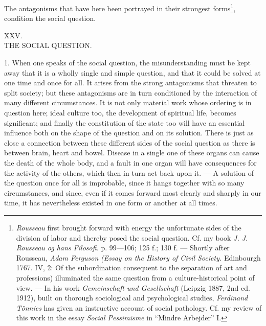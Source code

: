 \documentclass[12pt,a4paper,openany]{book}
\newcommand{\opage}[1]{\marginnote{\footnotesize\textit{[#1]}}}
\newcounter{etikch}
\newcommand{\chapterhead}[2]{\stepcounter{etikch}\bigskip\begin{center}\pdfbookmark[1]{#1 #2}{etikch.\arabic{etikch}}#1\\[3pt]{\large #2}\end{center}\medskip}
\begin{document}
The antagonisms that have here been portrayed in their strongest forms\footnote[1]{\emph{Rousseau} first brought forward with
energy the unfortunate sides of the division of labor and thereby posed the social question. Cf. my book \textit{J. J.
Rousseau og hans Filosofi.} p. 99---106; 125 f.; 130 f. --- Shortly after Rousseau, \emph{Adam Ferguson} \textit{(Essay on
the History of Civil Society.} Edinbourgh 1767. IV, 2: Of the subordination consequent to the separation of art and
professions) illuminated the same question from a culture-historical point of view. --- In his work \textit{Gemeinschaft
und Gesellschaft} (Leipzig 1887, 2nd ed. 1912), built on thorough sociological and psychological studies, \emph{Ferdinand
Tönnies} has given an instructive account of social pathology. Cf. my review of this work in the essay \textit{Social
Pessimisme} in ``Mindre Arbejder'' I.}, condition the social question.

\chapterhead{XXV.}{THE SOCIAL QUESTION.}

1. When one speaks of the social question, the misunderstanding must be kept away that it is a wholly single and simple
question, and that it could be solved at one time and once for all. It arises from the strong antagonisms that threaten
to split society; but these antagonisms are in turn conditioned by the interaction of many different circumstances. It is
not only material work whose ordering is in question here; ideal culture too, the development of spiritual life, becomes
significant; and finally the constitution of the state too will have an essential influence both on the shape of the
question and on its solution. There is just as close a connection between these different sides of the social question as
there is between brain, heart and bowel. Disease in a single one of these
\opage{365}organs can cause the death of the whole body, and a fault in one organ will have consequences for the activity
of the others, which then in turn act back upon it. --- A solution of the question once for all is improbable, since it
hangs together with so many circumstances, and since, even if it comes forward most clearly and sharply in our time, it
has nevertheless existed in one form or another at all times.
\end{document}
